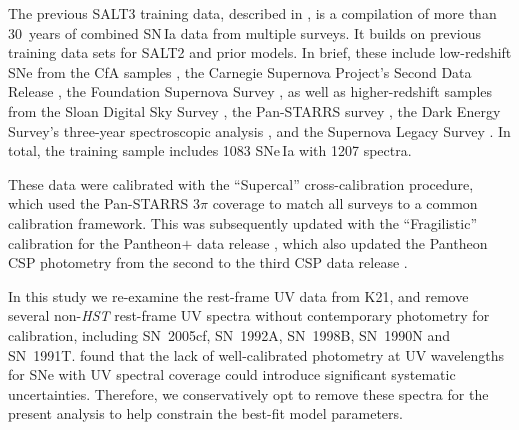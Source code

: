 \documentclass[twocolumn,tighten,times,floatfix]{aastex631}
\begin{document}
The previous SALT3 training data, described in \citet{kenworthy_salt3_2021}, is a compilation of more than 30~years of combined SN\,Ia data from multiple surveys.  It builds on previous training data sets for SALT2 and prior models.  In brief, these include low-redshift SNe from the CfA samples \citep{Riess99, Jha06, Hicken12}, the Carnegie Supernova Project's Second Data Release \citep{Stritzinger11}, the Foundation Supernova Survey \citep{Foley18,Jones19}, as well as higher-redshift samples from the Sloan Digital Sky Survey \citep{Sako18}, the Pan-STARRS survey \citep{Scolnic18}, the Dark Energy Survey's three-year spectroscopic analysis \citep{Abbott19}, and the Supernova Legacy Survey \citep{Astier06}.  In total, the training sample includes 1083 SNe\,Ia with 1207 spectra.

These data were calibrated with the ``Supercal'' cross-calibration procedure, which used the Pan-STARRS 3$\pi$ coverage to match all surveys to a common calibration framework.  This was subsequently updated with the ``Fragilistic'' calibration for the Pantheon$+$ data release \citep{Brout22,Brout21, Taylor23}, which also updated the Pantheon CSP photometry from the second to the third CSP data release \citep{Krisciunas17}.

In this study we re-examine the rest-frame UV data from K21, and remove several non-{\it HST} rest-frame UV spectra without contemporary photometry for calibration, including SN~2005cf, SN~1992A, SN~1998B, SN~1990N and SN~1991T.  
\cite{Dai23} found that the lack of well-calibrated photometry at UV wavelengths for SNe with UV spectral coverage could introduce significant systematic uncertainties. Therefore, we conservatively opt to remove these spectra for the present analysis to help constrain the best-fit model parameters.  
\end{document}
